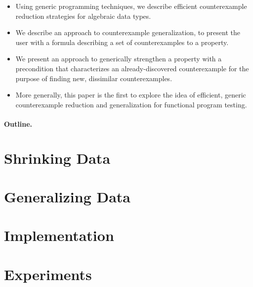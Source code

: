 \documentclass[9pt]{sigplanconf}
\begin{document}
\begin{itemize}

\item Using generic programming techniques, we describe efficient counterexample
  reduction strategies for algebraic data types.

\item We describe an approach to counterexample generalization, to present the
  user with a formula describing a set of counterexamples to a property.

\item We present an approach to generically strengthen a property with a
  precondition that characterizes an already-discovered counterexample for the
  purpose of finding new, dissimilar counterexamples.

\item More generally, this paper is the first to explore the idea of efficient,
  generic counterexample reduction and generalization for functional program testing.
\end{itemize}

\paragraph{Outline.}




\newpage



\section{Shrinking Data}


\section{Generalizing Data}


\section{Implementation}


\section{Experiments}

\end{document}
